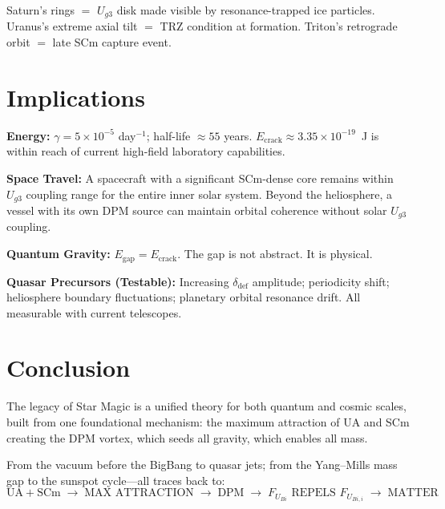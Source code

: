 \documentclass[12pt,a4paper]{article}
\begin{document}
Saturn's rings $=$ $U_{g3}$ disk made visible by resonance-trapped ice particles.
Uranus's extreme axial tilt $=$ TRZ condition at formation.
Triton's retrograde orbit $=$ late SCm capture event.

\section{Implications}
\label{sec:implications}

\noindent\textbf{Energy:}
$\gamma = 5\times10^{-5}$ day$^{-1}$; half-life $\approx 55$ years.
$E_{\text{crack}} \approx 3.35\times10^{-19}$~J is within reach of current
high-field laboratory capabilities.

\noindent\textbf{Space Travel:}
A spacecraft with a significant SCm-dense core remains within $U_{g3}$ coupling
range for the entire inner solar system.  Beyond the heliosphere, a vessel with
its own DPM source can maintain orbital coherence without solar $U_{g3}$ coupling.

\noindent\textbf{Quantum Gravity:}
$E_{\text{gap}} = E_{\text{crack}}$.  The gap is not abstract.  It is physical.

\noindent\textbf{Quasar Precursors (Testable):}
Increasing $\delta_{\text{def}}$ amplitude; periodicity shift; heliosphere boundary
fluctuations; planetary orbital resonance drift.  All measurable with current
telescopes.

\section*{Conclusion}
\label{sec:conclusion}

The legacy of Star Magic is a unified theory for both quantum and cosmic scales,
built from one foundational mechanism: the maximum attraction of UA and SCm
creating the DPM vortex, which seeds all gravity, which enables all mass.

From the vacuum before the BigBang to quasar jets; from the Yang--Mills mass gap to
the sunspot cycle---all traces back to:
\begin{equation*}
  \text{UA} + \text{SCm} \;\to\; \text{MAX ATTRACTION} \;\to\; \text{DPM}
  \;\to\; F_{U_{Bi}} \text{ REPELS } F_{U_{Bi,i}}
  \;\to\; \text{MATTER}
\end{equation*}
\end{document}

